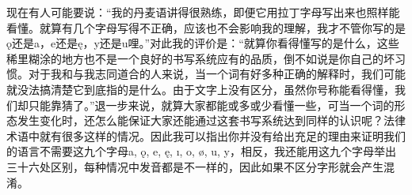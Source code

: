 \begin{translation*}{}
    现在有人可能要说：“我的丹麦语讲得很熟练，即便它用拉丁字母写出来也照样能看懂。就算有几个字母写得不正确，应该也不会影响我的理解，我才不管你写的是ǫ还是a，e还是ę，y还是u哩。”对此我的评价是：“就算你看得懂写的是什么，这些稀里糊涂的地方也不是一个良好的书写系统应有的品质，倒不如说是你自己的坏习惯。对于我和与我志同道合的人来说，当一个词有好多种正确的解释时，我们可能就没法搞清楚它到底指的是什么。由于文字上没有区分，虽然你号称能看得懂，我们却只能靠猜了。”退一步来说，就算大家都能或多或少看懂一些，可当一个词的形态发生变化时，还怎么能保证大家还能通过这套书写系统达到同样的认识呢？法律术语中就有很多这样的情况。因此我可以指出你并没有给出充足的理由来证明我们的语言不需要这九个字母a, ǫ, e, ę, ı, o, ø, u, y，相反，我还能用这九个字母举出三十六处区别，每种情况中发音都是不一样的，因此如果不区分字形就会产生混淆。
\end{translation*}
